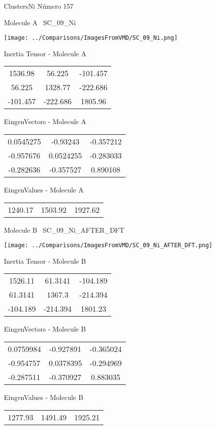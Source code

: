  \newpage

\vtab[-3cm]
\begin{center}
{\large ClustersNi \tab Número 157}
\end{center}
\begin{multicols}{2}
\begin{center}

Molecule A \
SC\_09\_Ni

\texttt{[image: ../Comparisons/ImagesFromVMD/SC\_09\_Ni.png]}

Inertia Tensor - Molecule A \\
\begin{tabular}{|c c c|}
1536.98	 & 	56.225	 & 	-101.457	 \\
56.225	 & 	1328.77	 & 	-222.686	 \\
-101.457	 & 	-222.686	 & 	1805.96
\end{tabular}

\vtab
 EingenVectors - Molecule A     \\
\begin{tabular}{|c c c|}
0.0545275	 & 	-0.93243	 & 	-0.357212	 \\
-0.957676	 & 	0.0524255	 & 	-0.283033	 \\
-0.282636	 & 	-0.357527	 & 	0.890108
\end{tabular}

\vtab
 EingenValues - Molecule A     \\
\begin{tabular}{|c c c|}
1240.17	 & 	1503.92	 & 	1927.62	 \\
\end{tabular}
\columnbreak

Molecule B \
SC\_09\_Ni\_AFTER\_DFT

\texttt{[image: ../Comparisons/ImagesFromVMD/SC\_09\_Ni\_AFTER\_DFT.png]}

Inertia Tensor - Molecule B \\
\begin{tabular}{|c c c|}
1526.11	 & 	61.3141	 & 	-104.189	 \\
61.3141	 & 	1367.3	 & 	-214.394	 \\
-104.189	 & 	-214.394	 & 	1801.23
\end{tabular}

\vtab
 EingenVectors - Molecule B     \\
\begin{tabular}{|c c c|}
0.0759984	 & 	-0.927891	 & 	-0.365024	 \\
-0.954757	 & 	0.0378395	 & 	-0.294969	 \\
-0.287511	 & 	-0.370927	 & 	0.883035
\end{tabular}

\vtab
 EingenValues - Molecule B     \\
\begin{tabular}{|c c c|}
1277.93	 & 	1491.49	 & 	1925.21	 \\
\end{tabular}

\end{center}
\end{multicols}

